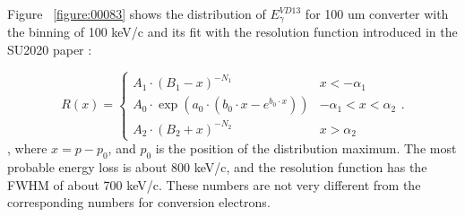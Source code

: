 Figure ~\ref{figure:00083} shows the distribution of $E_\gamma^{VD13}$
for 100 um converter with the binning of 100 keV/c and its fit with the resolution function introduced
in the SU2020 paper \cite{MU2E_SU2020_PAPER}:

\begin{equation}
  \label{eq:dio_mom_res}
  R(x) =
 \begin{cases}
    A_1 \cdot (B_1-x)^{-N_1}                                 & x < -\alpha_1 \\
    A_0 \cdot \exp (a_0 \cdot (b_0 \cdot x - e^{b_0 \cdot x})) & -\alpha_1< x < \alpha_2 \\
    A_2 \cdot (B_2+x)^{-N_2}                                 &  x > \alpha_2
  \end{cases}.
\end{equation}
, where $x = p-p_0$, and $p_0$ is the position of the distribution maximum.
The most probable energy loss is about 800 keV/c, 
and the resolution function has the FWHM of about 700 keV/c.
These numbers are not very different from the corresponding numbers for conversion electrons.

